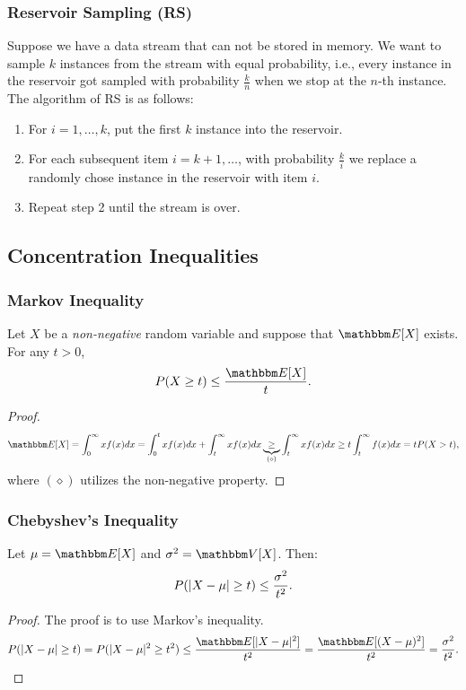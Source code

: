     \subsubsection{Reservoir Sampling (RS)}
        Suppose we have a data stream that can not be stored in memory. 
        We want to sample $k$ instances from the stream with equal probability, i.e., every instance in the reservoir got sampled with probability $\frac{k}{n}$ when we stop at the $n$-th instance.
        The algorithm of RS is as follows:
            \begin{enumerate}
                \item For $i=1, \ldots, k$, put the first $k$ instance into the reservoir.
                \item For each subsequent item $i=k+1, \ldots$, with probability $\frac{k}{i}$ we replace a randomly chose instance in the reservoir with item $i$.
                \item Repeat step 2 until the stream is over. 
            \end{enumerate}
        
            
\subsection{Concentration Inequalities}
    \subsubsection{Markov Inequality}
     Let $X$ be a \emph{non-negative} random variable and suppose that $\E[X]$ exists. 
     For any $t > 0$,
        \begin{equation}
            P(X \ge t) \le \frac{\E[X]}{t}.
        \end{equation}
    \begin{proof}
        \begin{equation}
            \E[X] = \int_{0}^{\infty}{ x f(x)} dx = \int_{0}^{t} x f(x) dx + \int_{t}^{\infty} x f(x) dx \underbrace{\ge}_{(\diamond)} \int_{t}^{\infty} x f(x) dx \ge t \int_{t}^{\infty} f(x) dx = t P(X > t),
        \end{equation}
    where $(\diamond)$ utilizes the non-negative property.
    \end{proof}
    
    \subsubsection{Chebyshev's Inequality}
    Let $\mu = \E[X]$ and $\sigma^2 = \Var[X]$.
    Then:
        \begin{equation}
            P(| X - \mu | \ge t) \le \frac{\sigma^2}{t^2}.
        \end{equation}
    \begin{proof}
        The proof is to use Markov's inequality.
        \begin{equation}
            P(\Abs{X - \mu} \ge t) = P(\Abs{X - \mu}^2 \ge t^2) \le \frac{\E[\Abs{X - \mu}^2]}{t^2} =  \frac{\E[(X - \mu)^2]}{t^2} = \frac{\sigma^2}{t^2}.
        \end{equation}
    \end{proof}
    
